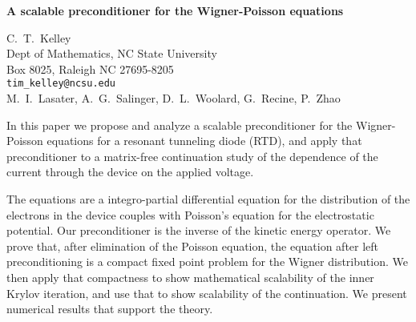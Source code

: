\documentclass{report}
\begin{document}

\begin{center}
{\large
{\bf A scalable preconditioner for the Wigner-Poisson equations}}

	C.~T.~Kelley \\
	Dept of Mathematics, NC State University \\
	Box 8025, Raleigh NC 27695-8205 \\
	{\tt tim\_kelley@ncsu.edu} \\
	M.~I.~Lasater, A.~G.~Salinger,
	D.~L.~Woolard, G.~Recine, P.~Zhao
\end{center}
In this paper we propose and analyze a scalable
preconditioner for the Wigner-Poisson equations for a
resonant tunneling diode (RTD), and apply that
preconditioner to a matrix-free continuation study of the
dependence of the current through the device on the applied
voltage.

The equations are a integro-partial differential
equation for the distribution of the electrons in the device
couples with Poisson's equation for the electrostatic
potential. Our preconditioner is the inverse of the kinetic
energy operator. We prove that, after elimination of the
Poisson equation, the equation after left preconditioning is
a compact fixed point problem for the Wigner distribution.
We then apply that compactness to show mathematical
scalability of the inner Krylov iteration, and use that to
show scalability of the continuation. We present numerical
results that support the theory.



\end{document}
